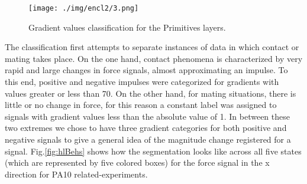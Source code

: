 \begin{figure}[h]
    \centering
    \texttt{[image: ./img/encl2/3.png]}
    \caption{Gradient values classification for the Primitives layers.}
    \label{tbl:GradientRangeValues}
\end{figure}
The classification first attempts to separate instances of data in which contact or mating takes place. On the one hand, contact phenomena is characterized by very rapid and large changes in force signals, almost approximating an impulse. To this end, positive and negative impulses were categorized for gradients with values greater or less than 70. On the other hand, for mating situations, there is little or no change in force, for this reason a constant label was assigned to signals with gradient values less than the absolute value of 1. In between these two extremes we chose to have three gradient categories for both positive and negative signals to give a general idea of the magnitude change registered for a signal. Fig.\ref{fig:hlBehs} shows how the segmentation looks like across all five states (which are represented by five colored boxes) for the force signal in the x direction for PA10 related-experiments.

